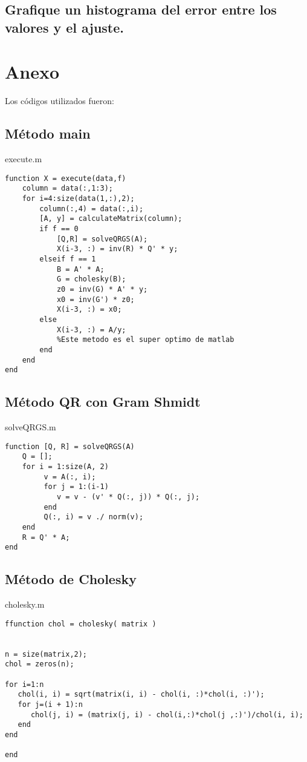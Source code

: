 \documentclass[]{article}
\begin{document}
\subsection{Grafique un histograma del error entre los valores y el ajuste.}


\pagebreak

\section{Anexo}

\par Los códigos utilizados fueron:
 
\subsection{Método main}
execute.m
\begin{lstlisting}
function X = execute(data,f)
    column = data(:,1:3);
	for i=4:size(data(1,:),2);
		column(:,4) = data(:,i);
		[A, y] = calculateMatrix(column);
        if f == 0
            [Q,R] = solveQRGS(A);
            X(i-3, :) = inv(R) * Q' * y;
        elseif f == 1
            B = A' * A;
            G = cholesky(B);
            z0 = inv(G) * A' * y;
            x0 = inv(G') * z0;
            X(i-3, :) = x0;
        else
            X(i-3, :) = A/y;
            %Este metodo es el super optimo de matlab
        end
	end
end
\end{lstlisting}

\subsection{Método QR con Gram Shmidt}
solveQRGS.m
\begin{lstlisting}
function [Q, R] = solveQRGS(A)
	Q = [];
	for i = 1:size(A, 2)
		 v = A(:, i);
		 for j = 1:(i-1)
		 	v = v - (v' * Q(:, j)) * Q(:, j);
		 end
		 Q(:, i) = v ./ norm(v);
	end
	R = Q' * A;
end
\end{lstlisting}

\subsection{Método de Cholesky}
cholesky.m
\begin{lstlisting}
ffunction chol = cholesky( matrix )


n = size(matrix,2);
chol = zeros(n);

for i=1:n
   chol(i, i) = sqrt(matrix(i, i) - chol(i, :)*chol(i, :)');
   for j=(i + 1):n
      chol(j, i) = (matrix(j, i) - chol(i,:)*chol(j ,:)')/chol(i, i);
   end
end

end

\end{lstlisting}
\end{document}
